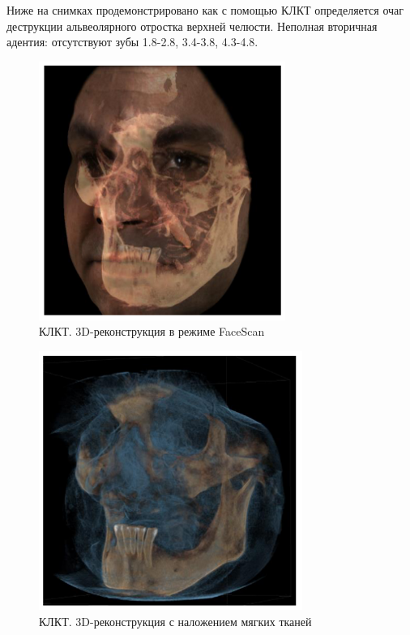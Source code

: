 \documentclass[11pt]{article}
\begin{document}
	
	Ниже на снимках продемонстрировано как с помощью КЛКТ определяется очаг деструкции альвеолярного отростка верхней челюсти. Неполная вторичная адентия: отсутствуют зубы 1.8-2.8, 3.4-3.8, 4.3-4.8. 
	
	\begin{figure}[H]
		\centering
		\includegraphics[width=\textwidth]{klkt1}
		\caption{ КЛКТ. 3D-реконструкция в режиме FaceScan ~\cite{rejr} }
		\label{fig:klkt1}
	\end{figure} 
	
		\begin{figure}[H]
		\centering
		\includegraphics[width=\textwidth]{klkt2}
		\caption{ КЛКТ.  3D-реконструкция с наложением мягких тканей ~\cite{rejr} }
		\label{fig:klkt1}
	\end{figure} 
	
\end{document}
